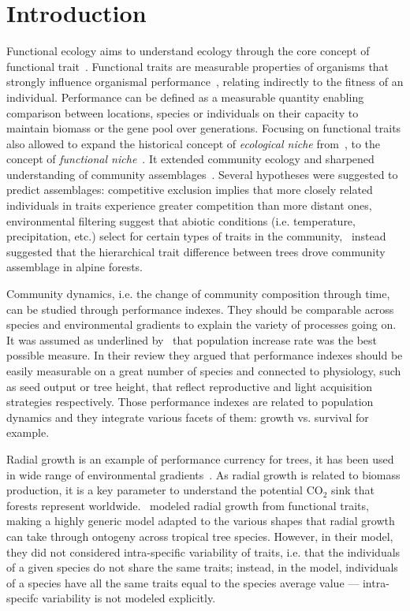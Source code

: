 \label{sec:Intro}
\section*{Introduction}

Functional ecology aims to understand ecology through the core concept of functional trait~\citep{mcgill_rebuilding_2006}. Functional traits are measurable properties of organisms that strongly influence organismal performance~\citep{mcgill_rebuilding_2006}, relating indirectly to the fitness of an individual. Performance can be defined as a measurable quantity enabling comparison between locations, species or individuals on their capacity to maintain biomass or the gene pool over generations. Focusing on functional traits also allowed to expand the historical concept of \emph{ecological niche} from~\citet{hutchinson_concluding_1957}, to the concept of \emph{functional niche}~\citep{violle_towards_2009}. It extended community ecology and sharpened understanding of community assemblages~\citep{kraft_functional_2010}. Several hypotheses were suggested to predict assemblages: competitive exclusion implies that more closely related individuals in traits experience greater competition than more distant ones, environmental filtering suggest that abiotic conditions (i.e. temperature, precipitation, etc.) select for certain types of traits in the community,~\citet{kunstler_competitive_2012} instead suggested that the hierarchical trait difference between trees drove community assemblage in alpine forests.

Community dynamics, i.e. the change of community composition through time, can be studied through performance indexes. They should be comparable across species and environmental gradients to explain the variety of processes going on. It was assumed as underlined by~\citet{mcgill_rebuilding_2006} that population increase rate was the best possible measure. In their review they argued that performance indexes should be easily measurable on a great number of species	and connected to physiology, such as seed output or tree height, that reflect reproductive and light acquisition strategies respectively. Those performance indexes are related to population dynamics and they integrate various facets of them: growth vs. survival for example.

Radial growth is an example of performance currency for trees, it has been used in wide range of environmental gradients~\citep{herault_functional_2011, kunstler_competitive_2012}. As radial growth is related to biomass production, it is a key parameter to understand the potential $\text{CO}_2$ sink that forests represent worldwide.~\citet{herault_functional_2011} modeled radial growth from functional traits, making a highly generic model adapted to the various shapes that radial growth can take through ontogeny across tropical tree species. However, in their model, they did not considered intra-specific variability of traits, i.e. that the individuals of a given species do not share the same traits; instead, in the model, individuals of a species have all the same traits equal to the species average value — intra-specifc variability is not modeled explicitly.

